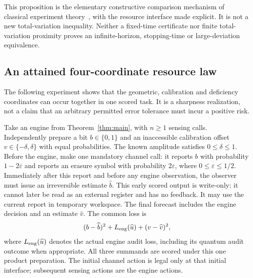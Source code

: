 This proposition is the elementary constructive comparison mechanism of classical experiment theory~\cite{blackwell,lecam}, with the resource interface made explicit. It is not a new total-variation inequality. Neither a fixed-time certificate nor finite total-variation proximity proves an infinite-horizon, stopping-time or large-deviation equivalence.

\subsection{An attained four-coordinate resource law}
The following experiment shows that the geometric, calibration and deficiency coordinates can occur together in one scored task. It is a sharpness realization, not a claim that an arbitrary permitted error tolerance must incur a positive risk.

Take an engine from Theorem~\ref{thm:main}, with $n\ge1$ sensing calls. Independently prepare a bit $b\in\{0,1\}$ and an inaccessible calibration offset $v\in\{-\delta,\delta\}$ with equal probabilities. The known amplitude satisfies $0\le\delta\le1$. Before the engine, make one mandatory channel call: it reports $b$ with probability $1-2\varepsilon$ and reports an erasure symbol with probability $2\varepsilon$, where $0\le\varepsilon\le1/2$. Immediately after this report and before any engine observation, the observer must issue an irreversible estimate $\widehat b$. This early scored output is write-only: it cannot later be read as an external register and has no feedback. It may use the current report in temporary workspace. The final forecast includes the engine decision and an estimate $\widehat v$. The common loss is
\begin{equation}\label{eq:jointloss}
 (b-\widehat b)^2+L_{\rm eng}(\widehat u)+(v-\widehat v)^2,
\end{equation}
where $L_{\rm eng}(\widehat u)$ denotes the actual engine audit loss, including its quantum audit outcome when appropriate. All three summands are scored under this one product preparation. The initial channel action is legal only at that initial interface; subsequent sensing actions are the engine actions.

